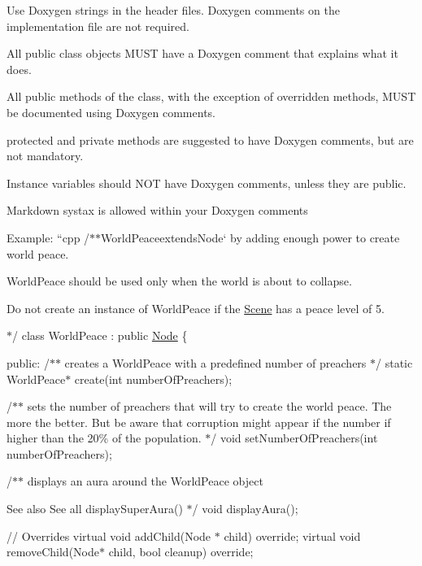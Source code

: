 \begin{DoxyItemize}
\item Use Doxygen strings in the header files. Doxygen comments on the implementation file are not required.
\item All public {\ttfamily class} objects M\+U\+ST have a Doxygen comment that explains what it does.
\item All {\ttfamily public} methods of the class, with the exception of overridden methods, M\+U\+ST be documented using Doxygen comments.
\item {\ttfamily protected} and {\ttfamily private} methods are suggested to have Doxygen comments, but are not mandatory.
\item Instance variables should N\+OT have Doxygen comments, unless they are public.
\item Markdown systax is allowed within your Doxygen comments
\end{DoxyItemize}

Example\+: ``{\ttfamily cpp /$\ast$$\ast$}World\+Peace{\ttfamily extends}Node` by adding enough power to create world peace.
\begin{DoxyItemize}
\item 
\item {\ttfamily World\+Peace} should be used only when the world is about to collapse.
\item Do not create an instance of {\ttfamily World\+Peace} if the {\ttfamily \hyperlink{classScene}{Scene}} has a peace level of 5.
\item $\ast$/ class World\+Peace \+: public \hyperlink{classNode}{Node} \{
\end{DoxyItemize}

public\+: /$\ast$$\ast$ creates a {\ttfamily World\+Peace} with a predefined number of preachers $\ast$/ static World\+Peace$\ast$ create(int number\+Of\+Preachers);

/$\ast$$\ast$ sets the number of preachers that will try to create the world peace. The more the better. But be aware that corruption might appear if the number if higher than the 20\% of the population. $\ast$/ void set\+Number\+Of\+Preachers(int number\+Of\+Preachers);

/$\ast$$\ast$ displays an aura around the World\+Peace object \begin{DoxySeeAlso}{See also}
See all {\ttfamily display\+Super\+Aura()} $\ast$/ void display\+Aura();
\end{DoxySeeAlso}
// Overrides virtual void add\+Child(\+Node $\ast$ child) override; virtual void remove\+Child(\+Node$\ast$ child, bool cleanup) override;

